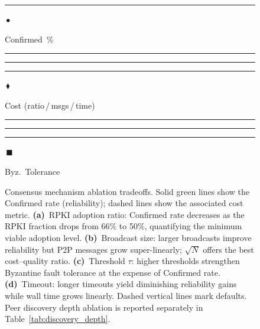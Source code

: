 \begin{figure}[t]

\vspace{2mm}
{\scriptsize
\textcolor{cGreen}{\rule{8pt}{2pt}\,$\bullet$} Confirmed~\%
\qquad
\textcolor{cOrange}{\rule[1pt]{4pt}{0.5pt}\rule[1pt]{2pt}{0pt}\rule[1pt]{4pt}{0.5pt}\,$\blacklozenge$} Cost (ratio\,/\,msgs\,/\,time)
\qquad
\textcolor{cBlue}{\rule[1pt]{4pt}{0.5pt}\rule[1pt]{2pt}{0pt}\rule[1pt]{4pt}{0.5pt}\,$\blacksquare$} Byz.\ Tolerance
}
\caption{Consensus mechanism ablation tradeoffs. Solid green lines show the Confirmed rate (reliability); dashed lines show the associated cost metric. \textbf{(a)}~RPKI adoption ratio: Confirmed rate decreases as the RPKI fraction drops from 66\% to 50\%, quantifying the minimum viable adoption level. \textbf{(b)}~Broadcast size: larger broadcasts improve reliability but P2P messages grow super-linearly; $\sqrt{N}$ offers the best cost--quality ratio. \textbf{(c)}~Threshold $\tau$: higher thresholds strengthen Byzantine fault tolerance at the expense of Confirmed rate. \textbf{(d)}~Timeout: longer timeouts yield diminishing reliability gains while wall time grows linearly. Dashed vertical lines mark defaults. Peer discovery depth ablation is reported separately in Table~\ref{tab:discovery_depth}.}
\label{fig:consensus_ablation}
\end{figure}

